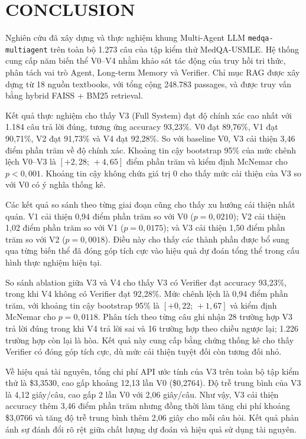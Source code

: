 \section{CONCLUSION}

Nghiên cứu đã xây dựng và thực nghiệm khung Multi-Agent LLM
\texttt{medqa-multiagent} trên toàn bộ 1.273 câu của tập kiểm thử
MedQA-USMLE. Hệ thống cung cấp năm biến thể V0--V4 nhằm khảo sát tác
động của truy hồi tri thức, phân tách vai trò Agent, Long-term
Memory và Verifier. Chỉ mục RAG được xây dựng từ 18 nguồn textbooks,
với tổng cộng 248.783 passages, và được truy vấn bằng hybrid FAISS + BM25
retrieval.

Kết quả thực nghiệm cho thấy V3 (Full System) đạt độ chính xác cao
nhất với 1.184 câu trả lời đúng, tương ứng accuracy 93,23\%. V0 đạt
89,76\%, V1 đạt 90,71\%, V2 đạt 91,73\% và V4 đạt 92,28\%. So với
baseline V0, V3 cải thiện 3,46 điểm phần trăm về độ chính xác. Khoảng
tin cậy bootstrap 95\% của mức chênh lệch V0--V3 là
$[+2{,}28;\,+4{,}65]$ điểm phần trăm và kiểm định McNemar cho
$p<0{,}001$. Khoảng tin cậy không chứa giá trị 0 cho thấy mức cải
thiện của V3 so với V0 có ý nghĩa thống kê.

Các kết quả so sánh theo từng giai đoạn cũng cho thấy xu hướng cải
thiện nhất quán. V1 cải thiện 0,94 điểm phần trăm so với V0
($p=0{,}0210$); V2 cải thiện 1,02 điểm phần trăm so với V1
($p=0{,}0175$); và V3 cải thiện 1,50 điểm phần trăm so với V2
($p=0{,}0018$). Điều này cho thấy các thành phần được bổ sung qua
từng biến thể đã đóng góp tích cực vào hiệu quả dự đoán tổng thể
trong cấu hình thực nghiệm hiện tại.

So sánh ablation giữa V3 và V4 cho thấy V3 có Verifier đạt accuracy
93,23\%, trong khi V4 không có Verifier đạt 92,28\%. Mức chênh lệch
là 0,94 điểm phần trăm, với khoảng tin cậy bootstrap 95\% là
$[+0{,}22;\,+1{,}67]$ và kiểm định McNemar cho $p=0{,}0118$.
Phân tích theo từng câu ghi nhận 28 trường hợp V3 trả lời đúng trong
khi V4 trả lời sai và 16 trường hợp theo chiều ngược lại; 1.226
trường hợp còn lại là hòa. Kết quả này cung cấp bằng chứng thống kê
cho thấy Verifier có đóng góp tích cực, dù mức cải thiện tuyệt đối
còn tương đối nhỏ.

Về hiệu quả tài nguyên, tổng chi phí API ước tính của V3 trên toàn
bộ tập kiểm thử là \$3,3530, cao gấp khoảng 12,13 lần V0
(\$0,2764). Độ trễ trung bình của V3 là 4,12 giây/câu, cao gấp
2 lần V0 với 2,06 giây/câu. Như vậy, V3 cải thiện accuracy thêm
3,46 điểm phần trăm nhưng đồng thời làm tăng chi phí khoảng
\$3,0766 và tăng độ trễ trung bình thêm 2,06 giây cho mỗi câu hỏi.
Kết quả phản ánh sự đánh đổi rõ rệt giữa chất lượng dự đoán và hiệu
quả sử dụng tài nguyên.

